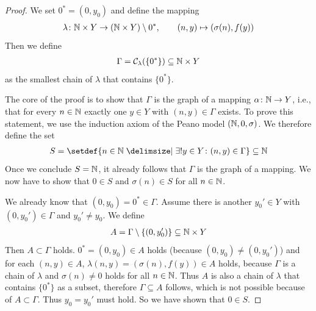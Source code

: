 \begin{proof}
    We set $0^*=(0,y_0)$ and define the mapping
    \begin{align}\lambda\colon \mathbb{N}\times Y\rightarrow(\mathbb{N}\times Y)\setminus 0^*,\qquad (n,y)\mapsto (\sigma(n),f(y))\end{align}
    Then we define
    \begin{align}\Gamma=\mathcal C_{\lambda}(\{0^*\})\subseteq \mathbb{N}\times Y\end{align}
    as the smallest chain of $\lambda$ that contains $\{0^*\}$.

    The core of the proof is to show that $\Gamma$ is the graph of a mapping $\alpha\colon \mathbb{N}\rightarrow Y$, i.e.,
    that for every $n\in\mathbb{N}$ exactly one $y\in Y$ with $(n,y)\in\Gamma$ exists.
    To prove this statement, we use the induction axiom of the Peano model $(\mathbb{N},0,\sigma)$.
    We therefore define the set
    \begin{align}S=\setdef{n\in\setN\given \exists!
    y\in Y\colon (n,y)\in\Gamma}\subseteq\setN\end{align}
    Once we conclude $S=\mathbb{N}$, it already follows that $\Gamma$ is the graph of a mapping. We now have to show that $0\in S$ and $\sigma(n)\in S$ for all $n\in\mathbb{N}$.
    
     We already know that $(0,y_0)=0^*\in\Gamma$.
    Assume there is another $y_0'\in Y$ with $(0,y_0')\in\Gamma$ and $y_0'\neq y_0$.
    We define
    \begin{align}A=\Gamma\setminus\{(0,y_0')\}\subseteq \mathbb{N}\times Y\end{align}
    Then $A\subset \Gamma$ holds.
    $0^*=(0,y_0)\in A$ holds (because $(0,y_0)\neq (0,y_0')$) and for each $(n,y)\in A$, $\lambda(n,y)=(\sigma(n),f(y))\in A$ holds, because $\Gamma$ is a chain of $\lambda$ and $\sigma(n)\neq 0$ holds for all $n\in\mathbb{N}$.
    Thus $A$ is also a chain of $\lambda$ that contains $\{0^*\}$ as a subset, therefore $\Gamma\subseteq A$ follows, which is not possible because of $A \subset\Gamma$. Thus $y_0=y_0'$ must hold. So we have shown that $0\in S$.


\end{proof}
